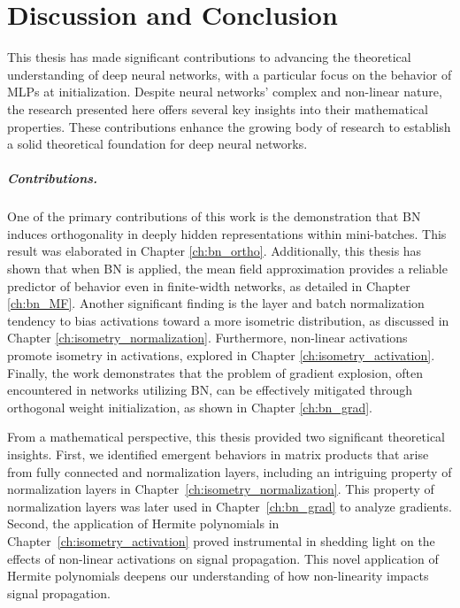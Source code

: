 

\chapter{Discussion and Conclusion}\label{ch:conclusion}

This thesis has made significant contributions to advancing the theoretical understanding of deep neural networks, with a particular focus on the behavior of MLPs at initialization. Despite neural networks' complex and non-linear nature, the research presented here offers several key insights into their mathematical properties. These contributions enhance the growing body of research to establish a solid theoretical foundation for deep neural networks. 

\paragraph{Contributions.}
One of the primary contributions of this work is the demonstration that BN induces orthogonality in deeply hidden representations within mini-batches. This result was elaborated in Chapter \ref{ch:bn_ortho}. Additionally, this thesis has shown that when BN is applied, the mean field approximation provides a reliable predictor of behavior even in finite-width networks, as detailed in Chapter \ref{ch:bn_MF}. Another significant finding is the layer and batch normalization tendency to bias activations toward a more isometric distribution, as discussed in Chapter \ref{ch:isometry_normalization}. Furthermore, non-linear activations promote isometry in activations, explored in Chapter \ref{ch:isometry_activation}. Finally, the work demonstrates that the problem of gradient explosion, often encountered in networks utilizing BN, can be effectively mitigated through orthogonal weight initialization, as shown in Chapter \ref{ch:bn_grad}.

From a mathematical perspective, this thesis provided two significant theoretical insights. First, we identified emergent behaviors in matrix products that arise from fully connected and normalization layers, including an intriguing property of normalization layers in Chapter~\ref{ch:isometry_normalization}. This property of normalization layers was later used in Chapter~\ref{ch:bn_grad} to analyze gradients. Second, the application of Hermite polynomials in Chapter~\ref{ch:isometry_activation} proved instrumental in shedding light on the effects of non-linear activations on signal propagation. This novel application of Hermite polynomials deepens our understanding of how non-linearity impacts signal propagation.


